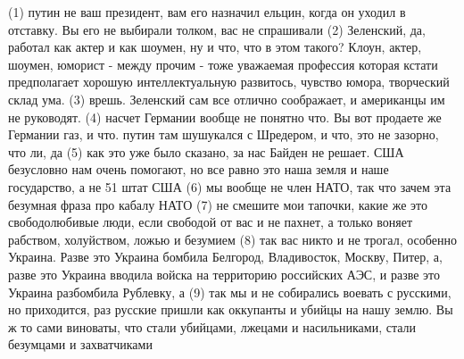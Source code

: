  
 
 
 
 

(1) путин не ваш президент, вам его назначил ельцин, когда он уходил в
отставку. Вы его не выбирали толком, вас не спрашивали (2) Зеленский, да,
работал как актер и как шоумен, ну и что, что в этом такого? Клоун, актер,
шоумен, юморист - между прочим - тоже уважаемая профессия которая кстати
предполагает хорошую интеллектуальную развитось, чувство юмора, творческий
склад ума. (3) врешь. Зеленский сам все отлично соображает, и американцы им не
руководят. (4) насчет Германии вообще не понятно что. Вы вот продаете же
Германии газ, и что. путин там шушукался с Шредером, и что, это не зазорно, что
ли, да (5) как это уже было сказано, за нас Байден не решает. США безусловно
нам очень помогают, но все равно это наша земля и наше государство, а не 51
штат США (6) мы вообще не член НАТО, так что зачем эта безумная фраза про
кабалу НАТО (7) не смешите мои тапочки, какие же это свободолюбивые люди, если
свободой от вас и не пахнет, а только воняет рабством, холуйством, ложью и
безумием (8) так вас никто и не трогал, особенно Украина. Разве это Украина
бомбила Белгород, Владивосток, Москву, Питер, а, разве это Украина вводила
войска на территорию российских АЭС, и разве это Украина разбомбила Рублевку, а
(9) так мы и не собирались воевать с русскими, но приходится, раз русские
пришли как оккупанты и убийцы на нашу землю. Вы ж то сами виноваты, что стали
убийцами, лжецами и насильниками, стали безумцами и захватчиками

